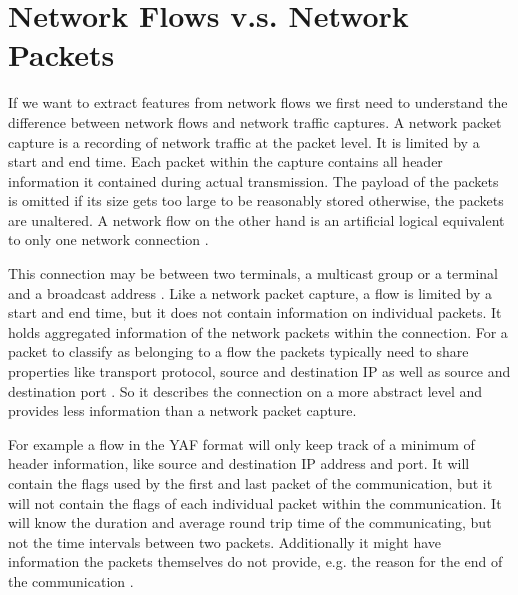 \documentclass[
	ngerman,
	ruledheaders=section,%
	class=report,%
	thesis={type=bachelor},%
	accentcolor=9c,%
	custommargins=true,%
	marginpar=false,%
	parskip=half-,%
	fontsize=11pt,%
]{tudapub}
\begin{document}
\section{Network Flows v.s. Network Packets}
\label{sec:flowvspackets}

If we want to extract features from network flows
we first need to understand the difference between network flows and network traffic captures.
A network packet capture is a recording of network traffic at the packet level.
It is limited by a start and end time.
Each packet within the capture contains all header information it contained during actual transmission.
The payload of the packets is omitted if its size gets too large to be reasonably stored otherwise, the packets are unaltered.
A network flow on the other hand is an artificial logical equivalent to only one network connection \cite{brownleeTrafficFlowMeasurement}.

This connection may be between two terminals, a multicast group or a terminal and a broadcast address \cite{rajahalmeIPv6FlowLabel}.
Like a network packet capture, a flow is limited by a start and end time,
but it does not contain information on individual packets.
It holds aggregated information of the network packets within the connection.
For a packet to classify as belonging to a flow the packets typically need to share properties like transport protocol, source and destination IP as well as source and destination port \cite{FlowbasedNetworkTraffic} \cite{claiseSpecificationIPFlow}.
So it describes the connection on a more abstract level and provides less information than a network packet capture.

For example a flow in the YAF format will only keep track of a minimum of header information, like source and destination IP address and port.
It will contain the flags used by the first and last packet of the communication,
but it will not contain the flags of each individual packet within the communication.
It will know the duration and average round trip time of the communicating, but not the time intervals between two packets.
Additionally it might have information the packets themselves do not provide, e.g. the reason for the end of the communication \cite{YAFDocumentation}.

\end{document}
